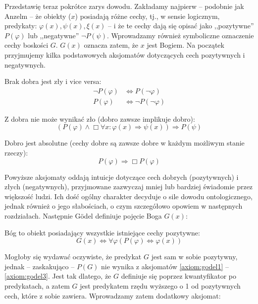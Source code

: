\documentclass[
    showauthor=true,   %
    showsubject=false, %
    showdate=true,     %
    hyphenation=true   %
]{src/wut-report}
\begin{document}
Przedstawię teraz pokrótce zarys dowodu. Zakładamy najpierw -- podobnie jak Anzelm -- że obiekty ($x$) posiadają różne cechy, tj., w sensie logicznym, predykaty: $\varphi(x), \psi(x), \xi(x)$ -- i że te cechy dają się opisać jako ,,pozytywne'' $P(\varphi)$ lub ,,negatywne'' $\neg P(\psi)$. Wprowadzamy również symboliczne oznaczenie cechy boskości $G$. $G(x)$ oznacza zatem, że $x$ jest Bogiem. Na początek przyjmujemy kilka podstawowych aksjomatów dotyczących cech pozytywnych i negatywnych.
\begin{axiom} \label{axiom:godel1}
	Brak dobra jest zły i vice versa:
	\begin{align*}
	\neg P(\varphi) & \Leftrightarrow P(\neg \varphi) \\
	P(\varphi) & \Leftrightarrow \neg P( \neg \varphi )
	\end{align*}
\end{axiom}
\begin{axiom} \label{axiom:godel2}
	Z dobra nie może wynikać zło (dobro zawsze implikuje dobro):
	\begin{equation*}
	\left( P(\varphi) \wedge \Box \forall x: \varphi(x) \Rightarrow \psi(x) \right) \Rightarrow P(\psi)
	\end{equation*}
\end{axiom}
\begin{axiom} \label{axiom:godel3}
	Dobro jest absolutne (cechy dobre są zawsze dobre w każdym możliwym stanie rzeczy):
	\begin{equation*}
	P(\varphi) \Rightarrow \Box P(\varphi)
	\end{equation*}
\end{axiom}
Powyższe aksjomaty oddają intuicje dotyczące cech dobrych (pozytywnych) i złych (negatywnych), przyjmowane zazwyczaj mniej lub bardziej świadomie przez większość ludzi. Ich dość ogólny charakter decyduje o sile dowodu ontologicznego, jednak również o jego słabościach, o czym szczegółowo opowiem w następnych rozdziałach.
Następnie Gödel definiuje pojęcie Boga $G(x)$:
\begin{definition} \label{def:godel1}
	Bóg to obiekt posiadający wszystkie istniejące cechy pozytywne:
	\begin{equation*}
	G(x) \Leftrightarrow \forall \varphi \left( P(\varphi) \Leftrightarrow \varphi(x) \right)
	\end{equation*}
\end{definition}
Mogłoby się wydawać oczywiste, że predykat $G$ jest sam w sobie pozytywny, jednak -- zaskakująco -- $P(G)$ nie wynika z aksjomatów \ref{axiom:godel1} -- \ref{axiom:godel3}. Jest tak dlatego, że $G$ definiuje się poprzez kwantyfikator po predykatach, a zatem $G$ jest predykatem rzędu wyższego o 1 od pozytywnych cech, które z sobie zawiera. Wprowadzamy zatem dodatkowy aksjomat:
\end{document}
